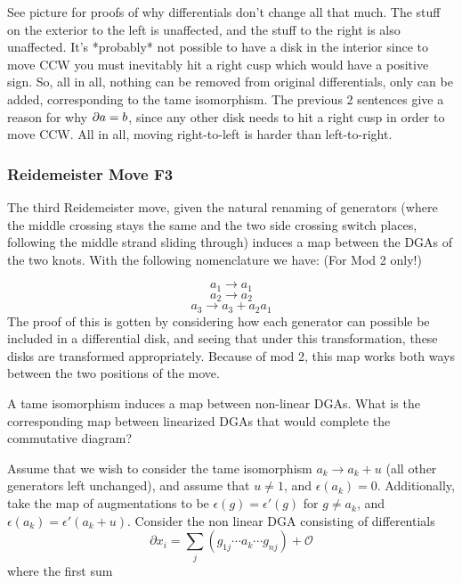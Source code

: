 \documentclass[11pt,oneside]{amsart}
\begin{document}
See picture for proofs of why differentials don't change all that much. The stuff on the exterior to the left is unaffected, and the stuff to the right is also unaffected. It's *probably* not possible to have a disk in the interior since to move CCW you must inevitably hit a right cusp which would have a positive sign. So, all in all, nothing can be removed from original differentials, only can be added, corresponding to the tame isomorphism. The previous 2 sentences give a reason for why $\partial a=b$, since any other disk needs to hit a right cusp in order to move CCW. All in all, moving right-to-left is harder than left-to-right.



\subsubsection{Reidemeister Move F3}

The third Reidemeister move, given the natural renaming of generators (where the middle crossing stays the same and the two side crossing switch places, following the middle strand sliding through) induces a map between the DGAs of the two knots. With the following nomenclature we have: (For Mod 2 only!)

\[a_1 \rightarrow a_1\]
\[a_2 \rightarrow a_2\]
\[a_3 \rightarrow a_3 + a_2a_1\]
The proof of this is gotten by considering how each generator can possible be included in a differential disk, and seeing that under this transformation, these disks are transformed appropriately. Because of mod 2, this map works both ways between the two positions of the move.


\begin{lemma}

A tame isomorphism induces a map between non-linear DGAs. What is the corresponding map between linearized DGAs that would complete the commutative diagram?

Assume that we wish to consider the tame isomorphism $a_k \rightarrow a_k + u$ (all other generators left unchanged), and assume that $u \neq 1$, and $\epsilon(a_k) = 0$. Additionally, take the map of augmentations to be $\epsilon(g) = \epsilon'(g)$ for $g \neq a_k$, and $\epsilon(a_k) = \epsilon'(a_k + u)$. Consider the non linear DGA consisting of differentials 
\[\partial x_i = \sum_{j} (g_{1j} \cdots a_k \cdots g_{nj}) + \mathcal{O}\]
where the first sum 


    
\end{lemma}
\end{document}

